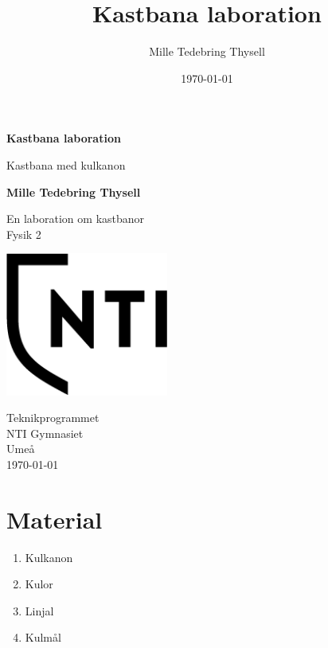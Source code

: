 \documentclass[11p]{article}
\title{Kastbana laboration }
\author{Mille Tedebring Thysell }
\date{\today}
\begin{document}
    \begin{titlepage}
        \begin{center}
            \vspace*{1cm}

            \Huge
            \textbf{Kastbana laboration}

            \vspace{0.5cm}
            \LARGE
            Kastbana med kulkanon

            \vspace{1.5cm}

            \textbf{Mille Tedebring Thysell}

            \vfill

            En laboration om kastbanor  \\
            Fysik 2

            \vspace{0.8cm}

            \includegraphics[width=0.4\textwidth]{../images/NTI Gymnasiet_Symbol_print_svart.png}

            \Large
            Teknikprogrammet\\
            NTI Gymnasiet\\
            Umeå\\
            \today

        \end{center}
    \end{titlepage}
    \newpage
    \section{Material}
    \begin{enumerate}
        \item Kulkanon
        \item Kulor
        \item Linjal
        \item Kulmål
    \end{enumerate}
\end{document}
